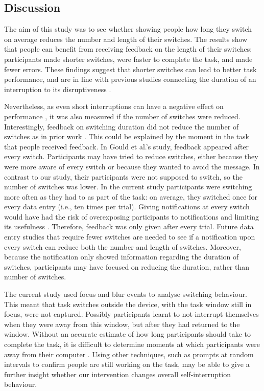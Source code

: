 \subsection{Discussion}
The aim of this study was to see whether showing people how long they switch on average reduces the number and length of their switches. The results show that people can benefit from receiving feedback on the length of their switches: participants made shorter switches, were faster to complete the task, and made fewer errors. These findings suggest that shorter switches can lead to better task performance, and are in line with previous studies connecting the duration of an interruption to its disruptiveness \citep{Altmann2017, Monk2008}.

Nevertheless, as even short interruptions can have a negative effect on performance \citep{Altmann2014}, it was also measured if the number of switches were reduced. Interestingly, feedback on switching duration did not reduce the number of switches as in prior work \citep{Gould2016a}. This could be explained by the moment in the task that people received feedback. In Gould et al.'s study, feedback appeared after every switch. Participants may have tried to reduce switches, either because they were more aware of every switch or because they wanted to avoid the message. In contrast to our study, their participants were not supposed to switch, so the number of switches was lower. In the current study participants were switching more often as they had to as part of the task: on average, they switched once for every data entry (i.e., ten times per trial). Giving notifications at every switch would have had the risk of overexposing participants to notifications and limiting its usefulness \citep{Cutrell2001, Whittaker2016}. Therefore, feedback was only given after every trial. Future data entry studies that require fewer switches are needed to see if a notification upon every switch can reduce both the number and length of switches. Moreover, because the notification only showed information regarding the duration of switches, participants may have focused on reducing the duration, rather than number of switches. 

The current study used focus and blur events to analyse switching behaviour. This meant that task switches outside the device, with the task window still in focus, were not captured. Possibly participants learnt to not interrupt themselves when they were away from this window, but after they had returned to the window. Without an accurate estimate of how long participants should take to complete the task, it is difficult to determine moments at which participants were away from their computer \citep{Rzeszotarski2013}.  Using other techniques, such as prompts at random intervals to confirm people are still working on the task, may be able to give a further insight whether our intervention changes overall self-interruption behaviour. 

